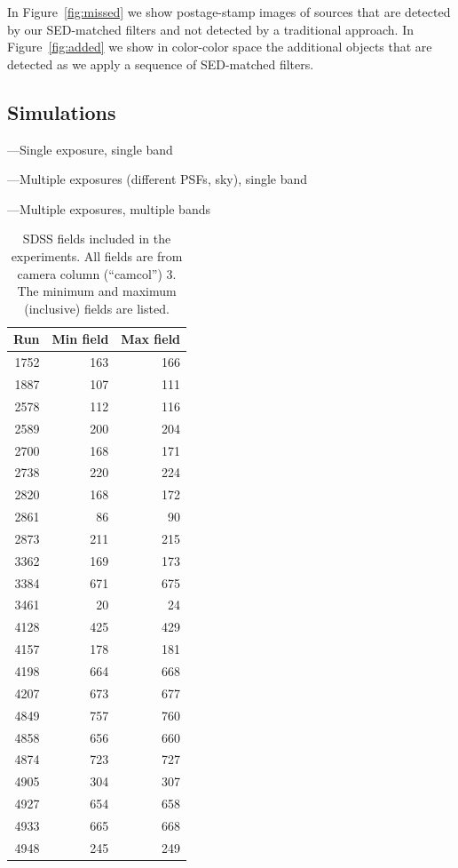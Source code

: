 \documentclass[letterpaper,preprint]{aastex62}
\newcommand{\figref}[1]{\mbox{Figure~\ref{#1}}}
\begin{document}

In \figref{fig:missed} we show postage-stamp images of sources that
are detected by our SED-matched filters and not detected by a
traditional approach.  In \figref{fig:added} we show in color-color
space the additional objects that are detected as we apply a sequence
of SED-matched filters.



\subsection{Simulations}

---Single exposure, single band

---Multiple exposures (different PSFs, sky), single band

---Multiple exposures, multiple bands









\begin{table}
\begin{center}
\begin{tabular}{|r|r|r|}
\hline
Run & Min field & Max field \\
\hline
1752 & 163 & 166 \\
1887 & 107 & 111 \\
2578 & 112 & 116 \\
2589 & 200 & 204 \\
2700 & 168 & 171 \\
2738 & 220 & 224 \\
2820 & 168 & 172 \\
2861 & 86 & 90 \\
2873 & 211 & 215 \\
3362 & 169 & 173 \\
3384 & 671 & 675 \\
3461 & 20 & 24 \\
4128 & 425 & 429 \\
4157 & 178 & 181 \\
4198 & 664 & 668 \\
4207 & 673 & 677 \\
4849 & 757 & 760 \\
4858 & 656 & 660 \\
4874 & 723 & 727 \\
4905 & 304 & 307 \\
4927 & 654 & 658 \\
4933 & 665 & 668 \\
4948 & 245 & 249 \\
\hline
\end{tabular}
\caption{SDSS fields included in the experiments.  All fields are from
  camera column (``camcol'') 3.  The minimum and maximum (inclusive)
  fields are listed.\label{tab:fields}}
\end{center}
\end{table}
\end{document}
